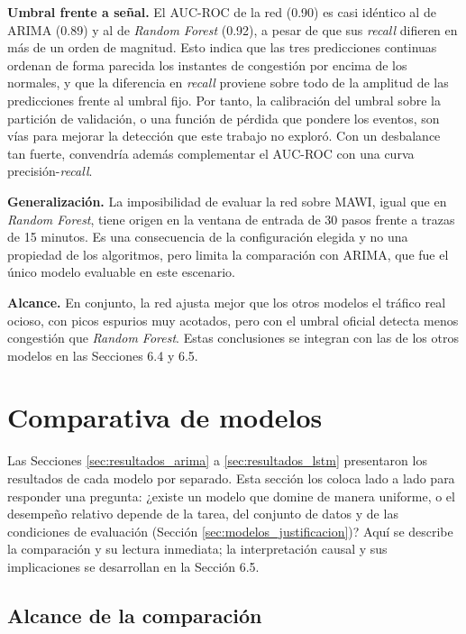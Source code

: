 \documentclass[12pt]{report}
\begin{document}
\textbf{Umbral frente a señal.} El AUC-ROC de la red (0.90) es casi idéntico al de ARIMA (0.89) y al de \textit{Random Forest} (0.92), a pesar de que sus \textit{recall} difieren en más de un orden de magnitud. Esto indica que las tres predicciones continuas ordenan de forma parecida los instantes de congestión por encima de los normales, y que la diferencia en \textit{recall} proviene sobre todo de la amplitud de las predicciones frente al umbral fijo. Por tanto, la calibración del umbral sobre la partición de validación, o una función de pérdida que pondere los eventos, son vías para mejorar la detección que este trabajo no exploró. Con un desbalance tan fuerte, convendría además complementar el AUC-ROC con una curva precisión-\textit{recall}.

\textbf{Generalización.} La imposibilidad de evaluar la red sobre MAWI, igual que en \textit{Random Forest}, tiene origen en la ventana de entrada de 30 pasos frente a trazas de 15 minutos. Es una consecuencia de la configuración elegida y no una propiedad de los algoritmos, pero limita la comparación con ARIMA, que fue el único modelo evaluable en este escenario.

\textbf{Alcance.} En conjunto, la red ajusta mejor que los otros modelos el tráfico real ocioso, con picos espurios muy acotados, pero con el umbral oficial detecta menos congestión que \textit{Random Forest}. Estas conclusiones se integran con las de los otros modelos en las Secciones 6.4 y 6.5.

\section{Comparativa de modelos}
\label{sec:comparativa_modelos}

Las Secciones \ref{sec:resultados_arima} a \ref{sec:resultados_lstm} presentaron los resultados de cada modelo por separado. Esta sección los coloca lado a lado para responder una pregunta: ¿existe un modelo que domine de manera uniforme, o el desempeño relativo depende de la tarea, del conjunto de datos y de las condiciones de evaluación (Sección \ref{sec:modelos_justificacion})? Aquí se describe la comparación y su lectura inmediata; la interpretación causal y sus implicaciones se desarrollan en la Sección 6.5.

\subsection*{Alcance de la comparación}
\end{document}

